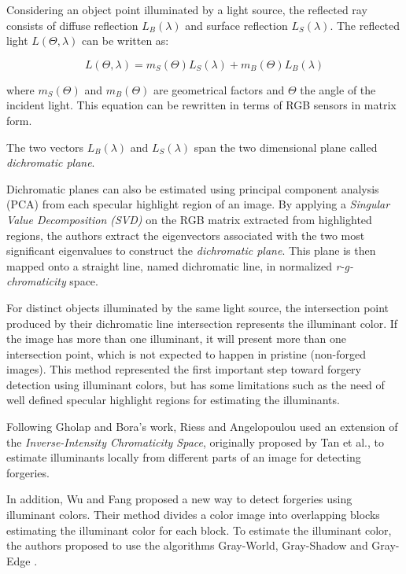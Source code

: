 Considering an object point illuminated by a light source, the reflected ray consists of diffuse reflection $L_B (\lambda)$ and surface reflection $L_S (\lambda)$. The reflected light $L(\Theta, \lambda)$ can be written as:

\begin{equation} \label{eq:dichromaticmodel}
L(\Theta, \lambda) = m_S(\Theta) L_S(\lambda) + m_B(\Theta) L_B(\lambda)
\end{equation}

where $m_S(\Theta)$ and $m_B(\Theta)$ are geometrical factors and $\Theta$ the angle of the incident light. This equation can be rewritten in terms of RGB sensors in matrix form.

The two vectors $L_B(\lambda)$ and $L_S(\lambda)$ span the two dimensional plane called \emph{dichromatic plane}.

Dichromatic planes can also be estimated using principal component analysis (PCA) from each specular highlight region of an image. By applying a \emph{Singular Value Decomposition (SVD)} on the RGB matrix extracted from highlighted regions, the authors extract the eigenvectors associated with the two most significant eigenvalues to construct the \emph{dichromatic plane}. This plane is then mapped onto a straight line, named dichromatic line, in normalized \emph{r-g-chromaticity} space. 

For distinct objects illuminated by the same light source, the intersection point produced by their dichromatic line intersection represents the illuminant color. If the image has more than one illuminant, it will present more than one intersection point, which is not expected to happen in pristine (non-forged images). This method represented the first important step toward forgery detection using illuminant colors, but has some limitations such as the need of well defined specular highlight regions for estimating the illuminants.

Following Gholap and Bora’s work, Riess and Angelopoulou\cite{riess2010scene} used an extension of the \emph{Inverse-Intensity Chromaticity Space}, originally proposed by Tan et al.\cite{tan2004color}, to estimate illuminants locally from different parts of an image for detecting forgeries.

In addition, Wu and Fang\cite{wu2011image} proposed a new way to detect forgeries using illuminant colors. Their method divides a color image into overlapping blocks estimating the illuminant color for each block. To estimate the illuminant color, the authors proposed to use the algorithms Gray-World, Gray-Shadow and Gray-Edge \cite{van2007edge}.

